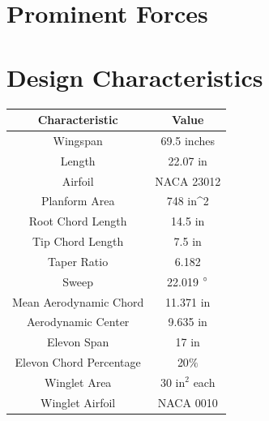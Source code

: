 \section{Prominent Forces}

\section{Design Characteristics}

\begin{center}
\begin{tabular}{c|c} 
 \hline
 Characteristic & Value \\
 \hline\hline
 Wingspan & 69.5 inches\\
 \hline
 Length & 22.07 in\\
 \hline
 Airfoil & NACA 23012\\
 \hline
 Planform Area & 748 in^2\\
 \hline
 Root Chord Length & 14.5 in\\
 \hline
 Tip Chord Length & 7.5 in\\
 \hline
 Taper Ratio & 6.182\\
 \hline
 Sweep & 22.019 $\degree$\\
 \hline
 Mean Aerodynamic Chord &  11.371 in\\
 \hline
 Aerodynamic Center & 9.635 in\\
 \hline
 Elevon Span & 17 in\\
 \hline
 Elevon Chord Percentage & 20$\percent$ \\
 \hline
 Winglet Area & 30 $\text{in}^2$ each\\
 \hline
 Winglet Airfoil & NACA 0010 \\
 \hline
\end{tabular}
\end{center}

